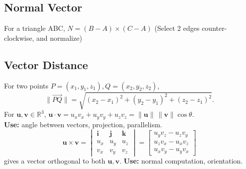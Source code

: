 \documentclass[8pt,twocolumn]{extarticle}
\begin{document}
\subsection*{Normal Vector}
For a triangle ABC, $N = (B - A) \times (C - A)$ (Select 2 edges counter-clockwise, and normalize)
\subsection*{Vector Distance}
For two points $P=(x_1,y_1,z_1), Q=(x_2,y_2,z_2)$,
\[
\|\overrightarrow{PQ}\| = \sqrt{(x_2-x_1)^2+(y_2-y_1)^2+(z_2-z_1)^2}.
\]
For $\mathbf{u}, \mathbf{v} \in \mathbb{R}^3$,
$
\mathbf{u} \cdot \mathbf{v} = u_x v_x + u_y v_y + u_z v_z
= \|\mathbf{u}\|\,\|\mathbf{v}\|\cos\theta.
$\\
\textbf{Use:} angle between vectors, projection, parallelism.
\[
\mathbf{u} \times \mathbf{v} =
\begin{vmatrix}
\mathbf{i} & \mathbf{j} & \mathbf{k} \\
u_x & u_y & u_z \\
v_x & v_y & v_z
\end{vmatrix} = \begin{bmatrix}u_y v_z - u_z v_y\\ u_z v_x - u_x v_z \\ u_x v_y - u_y v_x\end{bmatrix}\]
gives a vector orthogonal to both $\mathbf{u}, \mathbf{v}$.  
\textbf{Use:} normal computation, orientation.
\end{document}
